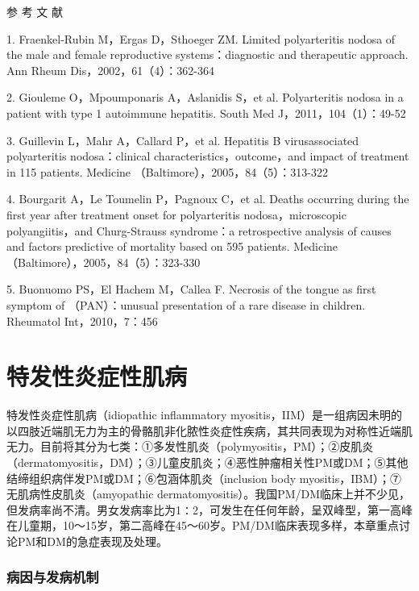 \protect\hypertarget{text00349.html}{}{}

\hypertarget{text00349.htmlux5cux23CHP14-2-5}{}
参 考 文 献

1. Fraenkel-Rubin M，Ergas D，Sthoeger ZM. Limited polyarteritis nodosa
of the male and female reproductive systems：diagnostic and therapeutic
approach. Ann Rheum Dis，2002，61（4）：362-364

2. Giouleme O，Mpoumponaris A，Aslanidis S，et al. Polyarteritis nodosa
in a patient with type 1 autoimmune hepatitis. South Med
J，2011，104（1）：49-52

3. Guillevin L，Mahr A，Callard P，et al. Hepatitis B virusassociated
polyarteritis nodosa：clinical characteristics，outcome，and impact of
treatment in 115 patients. Medicine
（Baltimore），2005，84（5）：313-322

4. Bourgarit A，Le Toumelin P，Pagnoux C，et al. Deaths occurring during
the first year after treatment onset for polyarteritis
nodosa，microscopic polyangiitis，and Churg-Strauss syndrome：a
retrospective analysis of causes and factors predictive of mortality
based on 595 patients. Medicine（Baltimore），2005，84（5）：323-330

5. Buonuomo PS，El Hachem M，Callea F. Necrosis of the tongue as first
symptom of （PAN）：unusual presentation of a rare disease in children.
Rheumatol Int，2010，7：456

\protect\hypertarget{text00350.html}{}{}

\chapter{特发性炎症性肌病}

特发性炎症性肌病（idiopathic inflammatory
myositis，IIM）是一组病因未明的以四肢近端肌无力为主的骨骼肌非化脓性炎症性疾病，其共同表现为对称性近端肌无力。目前将其分为七类：①多发性肌炎（polymyositis，PM）；②皮肌炎（dermatomyositis，DM）；③儿童皮肌炎；④恶性肿瘤相关性PM或DM；⑤其他结缔组织病伴发PM或DM；⑥包涵体肌炎（inclusion
body myositis，IBM）；⑦无肌病性皮肌炎（amyopathic
dermatomyositis）。我国PM/DM临床上并不少见，但发病率尚不清。男女发病率比为1∶2，可发生在任何年龄，呈双峰型，第一高峰在儿童期，10～15岁，第二高峰在45～60岁。PM/DM临床表现多样，本章重点讨论PM和DM的急症表现及处理。

\subsection{病因与发病机制}

